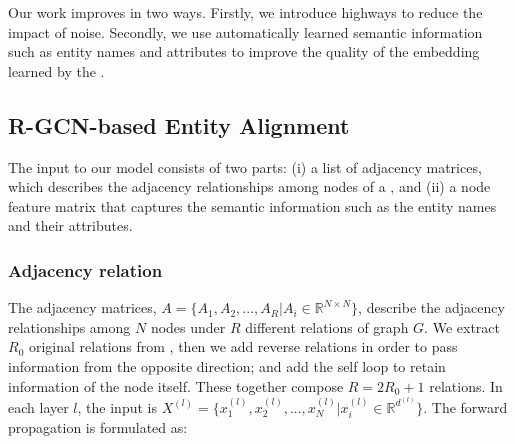  Our work improves \RGCNs in two ways. Firstly, we introduce highways to reduce the impact of noise.
    Secondly, we use automatically learned semantic information such as entity names and attributes to improve the quality of the \KG
    embedding learned by the \RGCN.




	
	
	\subsection{R-GCN-based Entity Alignment}
	\label{section:rgcn}	

 	The input to our \RGCN model consists of two parts: (i) a list of adjacency matrices, which describes the adjacency relationships among nodes of a
 \KG, and (ii) a node feature matrix that captures the semantic information such as the entity names and their attributes.

%


 \subsubsection{Adjacency relation}
 The adjacency matrices, $A=\{A_1,A_2,...,A_R |A_i \in \mathbb{R}^{N
 \times N} \}$, describe the adjacency relationships among $N$ nodes under $R$ different relations of graph $G$.
 We extract $R_0$ original
 relations from \KGs, then we add reverse relations in order to pass information from the opposite direction; and add the self
 loop to retain information of the node itself. These together compose $R=2R_0+1$ relations. 	In each layer $l$, the input is $X^{(l)} =
 \{x^{(l)}_1,x^{(l)}_2,...,x^{(l)}_{N} |x^{(l)}_{i} \in \mathbb{R}^{d^{(l)}}\}$. The forward propagation is formulated as:


